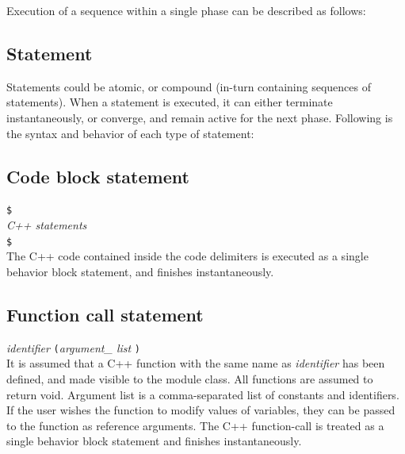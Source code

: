 \documentclass[12pt,a4paper]{report}
\begin{document}
	Execution of a sequence within a single phase can be described as follows:\\




	\subsection{Statement}
	Statements could be atomic, or compound (in-turn containing sequences of statements).
	When a statement is executed, it can either terminate instantaneously,
	or converge, and remain active for the next phase.
	Following is the syntax and behavior of each type of statement:\\

	\subsection{Code block statement}
		\texttt{\$}\\
		\textit{C++ statements}\\
		\texttt{\$}\\

	The C++ code contained inside the code delimiters is executed 
	as a single behavior block statement, and finishes instantaneously.


	\subsection{Function call statement}
		\textit{identifier} \texttt{(}\textit{argument\_ list} \texttt{)}\\

	It is assumed that a C++ function with the same name as \textit{identifier}
	has been defined, and made visible to the module class. All
	functions are assumed to return void.
	Argument list is a comma-separated list of constants and identifiers.
	If the user wishes the function to modify values of variables, they can
	be passed to the function as reference arguments.
	The C++ function-call is treated as a single behavior block statement 
	and finishes instantaneously.
\end{document}
